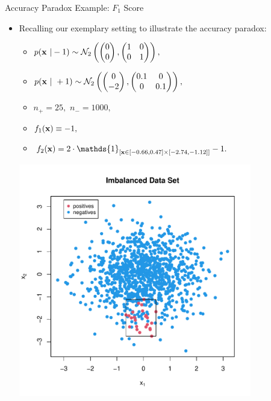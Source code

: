 \documentclass[11pt,compress,t,notes=noshow, xcolor=table]{beamer}
\begin{document}
\begin{vbframe}{Accuracy Paradox Example: $F_1$ Score}
	\footnotesize
	\begin{itemize}
		\item Recalling our exemplary setting to illustrate the accuracy paradox:
		
		\begin{minipage}{0.55\textwidth}    
			\begin{itemize}
				\scriptsize
				\item $p(\mathbf{x} ~| -1) \sim \mathcal{N}_2\left( 
				\begin{pmatrix}
					0 \\ 0
				\end{pmatrix}  , 
				\begin{pmatrix}
					1  & 0 \\ 0 & 1
				\end{pmatrix}   \right), $
				\item  $p(\mathbf{x} ~| ~ +1) \sim \mathcal{N}_2\left( 
				\begin{pmatrix}
					0 \\ -2
				\end{pmatrix}  , 
				\begin{pmatrix}
					0.1  & 0 \\ 0 & 0.1
				\end{pmatrix}   \right),  $
				\item $n_+ = 25,$ $n_- = 1000,$
%				
				\item $f_1(\mathbf{x}) \equiv -1,$ 
%				
				\item  $f_2(\xv) = 2 \cdot \mathds{1}_{[ \xv \in [-0.66,0.47]\times [-2.74,-1.12] ]} -1.$
			\end{itemize}
		\end{minipage}
		\begin{minipage}{0.35\textwidth}    
			\begin{center}
				\includegraphics[width=0.8\textwidth]{figure_man/accuracy_paradox}

\end{center}
\end{minipage}
\end{itemize}
\end{vbframe}
\end{document}
